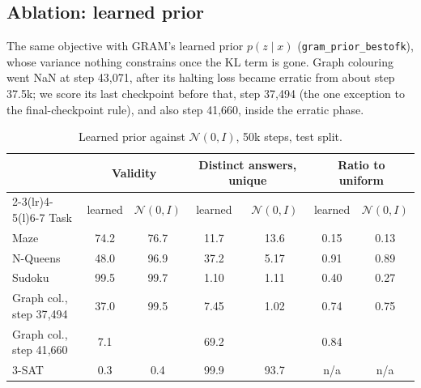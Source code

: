 \documentclass[11pt]{article}
\begin{document}
\subsection{Ablation: learned prior}
\label{sec:ablation}

The same objective with GRAM's learned prior $p(z\mid x)$ (\texttt{gram\_prior\_bestofk}), whose variance nothing
constrains once the KL term is gone. Graph colouring went NaN at step 43{,}071, after its halting loss became erratic
from about step 37.5k; we score its last checkpoint before that, step 37{,}494 (the one exception to the
final-checkpoint rule), and also step 41{,}660, inside the erratic phase.

\begin{table}[h]
\centering\small
\begin{tabular}{@{}lcccccc@{}}
\toprule
& \multicolumn{2}{c}{Validity} & \multicolumn{2}{c}{Distinct answers, unique} & \multicolumn{2}{c}{Ratio to uniform} \\
\cmidrule(lr){2-3}\cmidrule(lr){4-5}\cmidrule(l){6-7}
Task & learned & $\mathcal{N}(0,I)$ & learned & $\mathcal{N}(0,I)$ & learned & $\mathcal{N}(0,I)$ \\
\midrule
Maze & 74.2 & 76.7 & 11.7 & 13.6 & 0.15 & 0.13 \\
N-Queens & 48.0 & 96.9 & 37.2 & 5.17 & 0.91 & 0.89 \\
Sudoku & 99.5 & 99.7 & 1.10 & 1.11 & 0.40 & 0.27 \\
Graph col., step 37{,}494 & 37.0 & 99.5 & 7.45 & 1.02 & 0.74 & 0.75 \\
Graph col., step 41{,}660 & 7.1 & & 69.2 & & 0.84 & \\
3-SAT & 0.3 & 0.4 & 99.9 & 93.7 & n/a & n/a \\
\bottomrule
\end{tabular}
\caption{Learned prior against $\mathcal{N}(0,I)$, 50k steps, test split.}
\label{tab:ablation}
\end{table}
\end{document}
